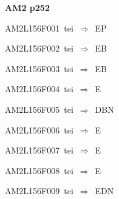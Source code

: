 \par\vfill\eject
{\bf\hfill AM2 p252\hfill\hbox{}}\par\bigskip
{\sixrm AM2L156F001\ {\sixit tei}\ }$\Rightarrow$\ EP\par\smallskip
{\sixrm AM2L156F002\ {\sixit tei}\ }$\Rightarrow$\ EB\par\smallskip
{\sixrm AM2L156F003\ {\sixit tei}\ }$\Rightarrow$\ EB\par\smallskip
{\sixrm AM2L156F004\ {\sixit tei}\ }$\Rightarrow$\ E\par\smallskip
{\sixrm AM2L156F005\ {\sixit tei}\ }$\Rightarrow$\ DBN\par\smallskip
{\sixrm AM2L156F006\ {\sixit tei}\ }$\Rightarrow$\ E\par\smallskip
{\sixrm AM2L156F007\ {\sixit tei}\ }$\Rightarrow$\ E\par\smallskip
{\sixrm AM2L156F008\ {\sixit tei}\ }$\Rightarrow$\ E\par\smallskip
{\sixrm AM2L156F009\ {\sixit tei}\ }$\Rightarrow$\ EDN\par\smallskip

